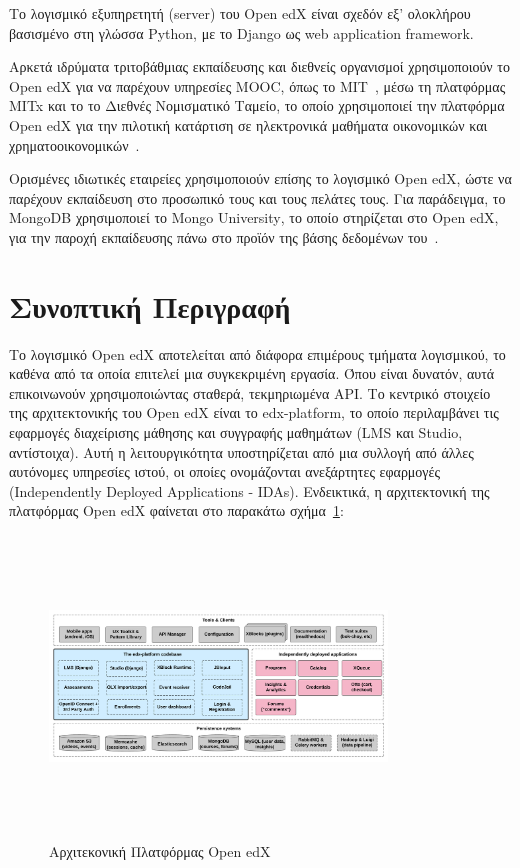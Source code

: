\documentclass[12pt]{report}
\begin{document}
Το λογισμικό εξυπηρετητή (\textlatin{server}) του \textlatin{Open edX} είναι σχεδόν εξ' ολοκλήρου βασισμένο στη γλώσσα \textlatin{Python}, με το \textlatin{Django} ως \textlatin{web application framework}.

Αρκετά ιδρύματα τριτοβάθμιας εκπαίδευσης και διεθνείς οργανισμοί χρησιμοποιούν το \textlatin{Open edX} για να παρέχουν υπηρεσίες \textlatin{MOOC}, όπως το \textlatin{MIT}~\cite{mit_open_learning_2018}, μέσω τη πλατφόρμας \textlatin{MITx} και το το Διεθνές Νομισματικό Ταμείο, το οποίο χρησιμοποιεί την πλατφόρμα \textlatin{Open edX} για την πιλοτική κατάρτιση σε ηλεκτρονικά μαθήματα οικονομικών και χρηματοοικονομικών~\cite{edx_2014}.

Ορισμένες ιδιωτικές εταιρείες χρησιμοποιούν επίσης το λογισμικό \textlatin{Open edX}, ώστε να παρέχουν εκπαίδευση στο προσωπικό τους και τους πελάτες τους. Για παράδειγμα, το \textlatin{MongoDB} χρησιμοποιεί το \textlatin{Mongo University}, το οποίο στηρίζεται στο \textlatin{Open edX}, για την παροχή εκπαίδευσης πάνω στο προϊόν της βάσης δεδομένων του~\cite{mongodb}.

\section{Συνοπτική Περιγραφή}
Το λογισμικό \textlatin{Open edX} αποτελείται από διάφορα επιμέρους τμήματα λογισμικού, το καθένα από τα οποία επιτελεί μια συγκεκριμένη εργασία. Όπου είναι δυνατόν, αυτά επικοινωνούν χρησιμοποιώντας σταθερά, τεκμηριωμένα \textlatin{API}. Το κεντρικό στοιχείο της αρχιτεκτονικής του \textlatin{Open edX} είναι το \textlatin{edx-platform}, το οποίο περιλαμβάνει τις εφαρμογές διαχείρισης μάθησης και συγγραφής μαθημάτων (\textlatin{LMS} και \textlatin{Studio}, αντίστοιχα). Αυτή η λειτουργικότητα υποστηρίζεται από μια συλλογή από άλλες αυτόνομες υπηρεσίες ιστού, οι οποίες ονομάζονται ανεξάρτητες εφαρμογές (\textlatin{Independently Deployed Applications - IDAs}). Ενδεικτικά, η αρχιτεκτονική της πλατφόρμας \textlatin{Open edX} φαίνεται στο παρακάτω σχήμα~\ref{fig:edx_arch}:
\begin{figure}[!htbp]
\centering
\includegraphics[width=0.8\textwidth, height=8cm]{edx-architecture}
\caption{Αρχιτεκονική Πλατφόρμας \textlatin{Open edX}}
\label{fig:edx_arch}
\end{figure}
\end{document}
